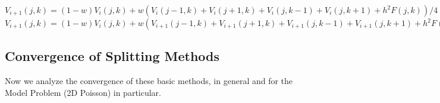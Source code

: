 \documentclass[11pt]{article}
\numberwithin{equation}{section}
\begin{document}
\begin{itemize}
\begin{algorithmfrm}
        \begin{algorithmic}[1]
            \State $V_{i+1}(j,k) = (1-w)V_i(j,k) + w(V_i(j-1,k) + V_i(j+1,k) + V_i(j,k-1) + V_i(j,k+1) + h^2 F(j,k))/4$ 
            \EndFor
            \State $V_{i+1}(j,k) = (1-w)V_i(j,k) + w(V_{i+1}(j-1,k) + V_{i+1}(j+1,k) + V_{i+1}(j,k-1) + V_{i+1}(j,k+1) + h^2 F(j,k))/4$ 
            \EndFor
        \end{algorithmic}
    \end{algorithmfrm}
\end{itemize}

\subsection{Convergence of Splitting Methods}
Now we analyze the convergence of these basic methods, in general and for the Model Problem (2D Poisson) in particular.
\end{document}
